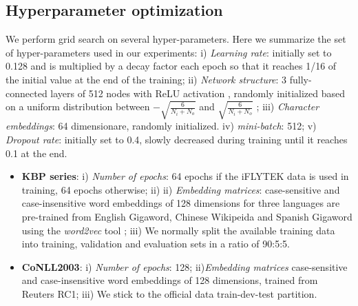 \documentclass[11pt,a4paper]{article}
\begin{document}
\subsection{Hyperparameter optimization}

We perform grid search on several hyper-parameters. Here we summarize the set of hyper-parameters used in our experiments:
i) {\it Learning rate}: initially set to 0.128 and is multiplied by a decay factor each epoch so that it reaches 1/16 of the initial value at the end of the training;
ii) {\it Network structure}: 3 fully-connected layers of 512 nodes with ReLU activation , randomly initialized based on a uniform distribution between $-\sqrt{\frac{6}{N_i + N_o}}$  and $\sqrt{\frac{6}{N_i + N_o}}$ \cite{glorot2011deep};
iii) {\it Character embeddings}: 64 dimensionare, randomly initialized.
iv) {\it mini-batch}: 512;
v) {\it Dropout rate}: initially set to 0.4, slowly decreased during training until it reaches 0.1 at the end.



\begin{itemize}
	\item \textbf{KBP series}:
	i) {\it Number of epochs}: 64 epochs if the iFLYTEK data is used in training, 64 epochs otherwise; ii)
	ii) {\it Embedding matrices}: 
	case-sensitive and case-insensitive word embeddings of 128 dimensions for three languages are pre-trained from English Gigaword, Chinese Wikipeida and Spanish Gigaword using the {\em word2vec} tool \cite{mikolov2013distributed};
	iii) We normally split the available training data into training, validation and evaluation sets in a ratio of 90:5:5.
	
	\item \textbf{CoNLL2003}:
	i) {\it Number of epochs}: 128;
	ii){\it Embedding matrices} case-sensitive and case-insensitive word embeddings of 128 dimensions, trained from Reuters RC1;
	iii) We stick to the official data train-dev-test partition.  
\end{itemize}
\end{document}
